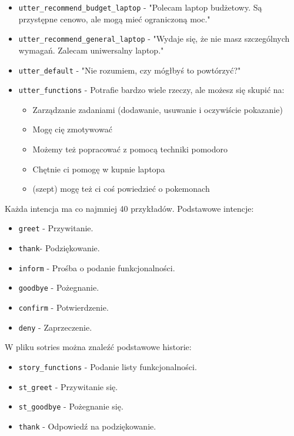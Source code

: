 \documentclass{article}
\begin{document}
\begin{itemize}
  \item[\textcolor{violet}{\textbullet}] \verb|utter_recommend_budget_laptop| - "Polecam laptop budżetowy. Są przystępne cenowo, ale mogą mieć ograniczoną moc."
  \item[\textcolor{violet}{\textbullet}] \verb|utter_recommend_general_laptop| - "Wydaje się, że nie masz szczególnych wymagań. Zalecam uniwersalny laptop."
  \item[\textcolor{violet}{\textbullet}] \verb|utter_default| - "Nie rozumiem, czy mógłbyś to powtórzyć?"
  \item[\textcolor{violet}{\textbullet}] \verb|utter_functions| - Potrafie bardzo wiele rzeczy, ale możesz się skupić na:
    \begin{itemize}
      \item Zarządzanie zadaniami (dodawanie, usuwanie i oczywiście pokazanie)
      \item Mogę cię zmotywować
      \item Możemy też popracować z pomocą techniki pomodoro
      \item Chętnie ci pomogę w kupnie laptopa
      \item (szept) mogę też ci coś powiedzieć o pokemonach
    \end{itemize}
\end{itemize}
Każda intencja ma co najmniej 40 przykładów. Podstawowe intencje:
\begin{itemize}
    \item[\textcolor{violet}{\textbullet}] \verb|greet| - Przywitanie.
    \item[\textcolor{violet}{\textbullet}] \verb|thank|- Podziękowanie.
    \item[\textcolor{violet}{\textbullet}] \verb|inform| - Prośba o podanie funkcjonalności.
    \item[\textcolor{violet}{\textbullet}] \verb|goodbye| - Pożegnanie.
    \item[\textcolor{violet}{\textbullet}] \verb|confirm| - Potwierdzenie.
    \item[\textcolor{violet}{\textbullet}] \verb|deny| - Zaprzeczenie.
\end{itemize}
W pliku sotries można znaleźć podstawowe historie:
\begin{itemize}
    \item[\textcolor{violet}{\textbullet}] \verb|story_functions| - Podanie listy funkcjonalności.
    \item[\textcolor{violet}{\textbullet}] \verb|st_greet| - Przywitanie się.
    \item[\textcolor{violet}{\textbullet}] \verb|st_goodbye| - Pożegnanie się.
    \item[\textcolor{violet}{\textbullet}] \verb|thank| - Odpowiedź na podziękowanie.
\end{itemize}
\end{document}
